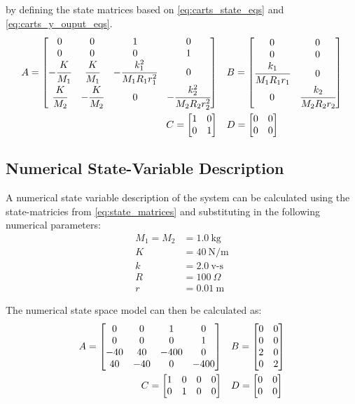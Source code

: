 \documentclass[]{article}
\begin{document}
		 by defining the state matrices based on \eqref{eq:carts_state_eqs} and \eqref{eq:carts_y_ouput_eqs}.
		 \begin{equation}
 			\begin{aligned}
		 		A = \mqty[	0	& 0			& 1					& 0\\
					 		0	& 0	 		& 0					& 1\\
					 		-\cfrac{K}{M_1}	& \cfrac{K}{M_1}	& -\cfrac{k_1^2}{M_1 R_1 r_1^2}	& 0\\
					 		\cfrac{K}{M_2}	& -\cfrac{K}{M_2}	& 0								& -\cfrac{k_2^2}{M_2 R_2 r_2^2}
					 		] \ \ \
		 		&B = \mqty[ 0						& 0\\
					 		0						& 0\\
					 		\cfrac{k_1}{M_1 R_1 r_1}	& 0\\
					 		0						& \cfrac{k_2}{M_2 R_2 r_2}
					 		]\\
		 		C = \mqty[\dmat[0]{1,1}] \ \ \
		 		&D = \mqty[\zmat{2}{2}]
		 	\end{aligned}
	 		\label{eq:carts_state_matrices}
		 \end{equation}
	
	\subsection{Numerical State-Variable Description}
		A numerical state variable description of the system can be calculated using the state-matricies from \eqref{eq:state_matrices} and substituting in the following numerical parameters:
		\begin{align*}
			M_1 = M_2 &= 1.0 \ \text{kg} \\
			K &= 40 \ \text{N/m}\\
			k &= 2.0 \ \text{v-s} \\
			R &= 100  \ \Omega \\
			r &= 0.01 \ \text{m}
		\end{align*}
	
		The numerical state space model can then be calculated as:
		 \begin{equation}
			\begin{aligned}
				A = \mqty[	0	& 0		& 1		& 0\\
							0	& 0	 	& 0		& 1\\
							-40	& 40	& -400	& 0\\
							40	& -40	& 0		& -400
							] \ \ \
				&B = \mqty[ 0	& 0\\
							0	& 0\\
							2	& 0\\
							0	& 2
							]\\
				C = \mqty[	1	&0	&0	&0\\
							0	&1	&0	&0] \ \ \
				&D = \mqty[\zmat{2}{2}]
			\end{aligned}
			\label{eq:carts_state_matrices}
		\end{equation}
		
\end{document}
